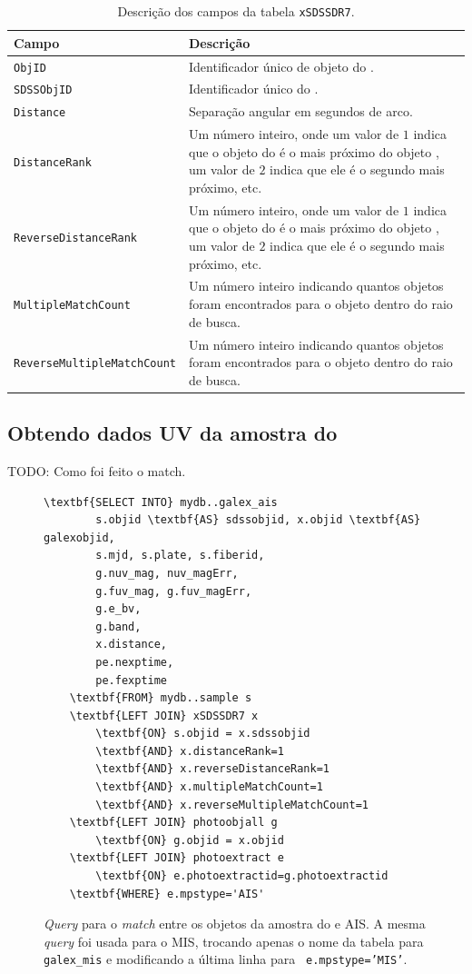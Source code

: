 \begin{table}
	\caption[Descrição dos campos da tabela {\tt xSDSSDR7}.]
	{Descrição dos campos da tabela {\tt xSDSSDR7}.}
	\begin{tabular}{l p{8cm}}
		Campo & Descrição\\
		\midrule
		{\tt ObjID} &
		Identificador único de objeto do \galex.
		\\
		{\tt SDSSObjID} &
		Identificador único do \SDSS.
		\\
		{\tt Distance} &
		Separação angular em segundos de arco.
		\\
		{\tt DistanceRank} &
		Um número inteiro, onde um valor de $1$ indica que o objeto do \galex é o
		mais próximo do objeto \SDSS, um valor de $2$ indica que ele é o segundo mais
		próximo, etc.
		\\
		{\tt ReverseDistanceRank} &
		Um número inteiro, onde um valor de $1$ indica que o objeto do \SDSS é o mais
		próximo do objeto \galex, um valor de $2$ indica que ele é o segundo mais
		próximo, etc.
		\\
		{\tt MultipleMatchCount} &
		Um número inteiro indicando quantos objetos \SDSS foram encontrados para o
		objeto \galex dentro do raio de busca.
		\\
		{\tt ReverseMultipleMatchCount} &
		Um número inteiro indicando quantos objetos \galex foram encontrados para o
		objeto \SDSS dentro do raio de busca.
		\\
	\end{tabular}
	\label{tab:CamposXSDSSDR7}
\end{table}

\subsection{Obtendo dados UV da amostra do \starlight}
TODO: Como foi feito o match.


\begin{figure}
	\begin{Verbatim}[commandchars=\\\{\}]
	\textbf{SELECT INTO} mydb..galex_ais
		s.objid \textbf{AS} sdssobjid, x.objid \textbf{AS} galexobjid,
		s.mjd, s.plate, s.fiberid,
		g.nuv_mag, nuv_magErr,
		g.fuv_mag, g.fuv_magErr,
		g.e_bv,
		g.band,
		x.distance,
		pe.nexptime,
		pe.fexptime
	\textbf{FROM} mydb..sample s
	\textbf{LEFT JOIN} xSDSSDR7 x
		\textbf{ON} s.objid = x.sdssobjid
		\textbf{AND} x.distanceRank=1
		\textbf{AND} x.reverseDistanceRank=1
		\textbf{AND} x.multipleMatchCount=1
		\textbf{AND} x.reverseMultipleMatchCount=1
	\textbf{LEFT JOIN} photoobjall g
		\textbf{ON} g.objid = x.objid
	\textbf{LEFT JOIN} photoextract e
		\textbf{ON} e.photoextractid=g.photoextractid
	\textbf{WHERE} e.mpstype='AIS'
	\end{Verbatim}
	\caption[{\em Query} para o {\em match} entre os objetos da amostra do
	\starlight e \galex AIS.]
	{{\em Query} para o {\em match} entre os objetos da amostra do \starlight e
	\galex AIS. A mesma {\em query} foi usada para o MIS, trocando apenas o nome da
	tabela para {\tt galex\_mis} e modificando a última linha para {\tt
	e.mpstype='MIS'}.}
	\label{fig:QueryMatchAIS}
\end{figure}

